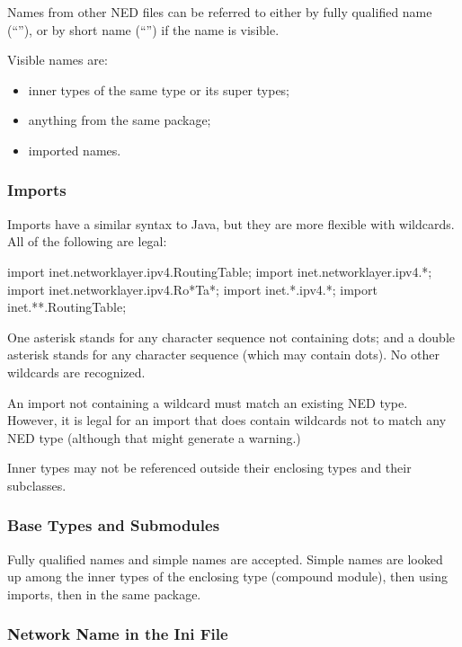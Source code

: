 Names from other NED files can be referred to either by fully qualified
name (``''), or by short name
(``'') if the name is visible.

Visible names are:

\begin{itemize}
  \item inner types of the same type or its super types;
  \item anything from the same package;
  \item imported names.
\end{itemize}

\subsubsection{Imports}
\label{sec:ned-ref:imports}

Imports have a similar syntax to Java, but they are more flexible with wildcards.
All of the following are legal:

\begin{ned}
import inet.networklayer.ipv4.RoutingTable;
import inet.networklayer.ipv4.*;
import inet.networklayer.ipv4.Ro*Ta*;
import inet.*.ipv4.*;
import inet.**.RoutingTable;
\end{ned}

One asterisk stands for any character sequence not containing dots; and a
double asterisk stands for any character sequence (which may contain dots).
No other wildcards are recognized.

An import not containing a wildcard must match an existing NED type.
However, it is legal for an import that does contain wildcards
not to match any NED type (although that might generate a warning.)

Inner types may not be referenced outside their enclosing types and
their subclasses.

\subsubsection{Base Types and Submodules}
\label{sec:ned-ref:base-types-and-submodules}

Fully qualified names and simple names are accepted. Simple names
are looked up among the inner types of the enclosing type (compound
module), then using imports, then in the same package.

\subsubsection{Network Name in the Ini File}
\label{sec:ned-ref:network-name-in-ini-file}


